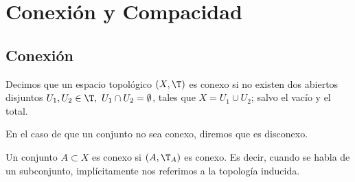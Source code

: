 \chapter{Conexión y Compacidad}

\section{Conexión}

\begin{definicion}[Conexión]
    Decimos que un espacio topológico $(X,\T)$ es conexo si no existen dos abiertos disjuntos $U_1,U_2\in \T,~U_1\cap U_2=\emptyset$, tales que $X=U_1\cup U_2$; salvo el vacío y el total.

    En el caso de que un conjunto no sea conexo, diremos que es disconexo.

    Un conjunto $A\subset X$ es conexo si $(A,\T_A)$ es conexo. Es decir, cuando se habla de un subconjunto, implícitamente nos referimos a la topología inducida.
\end{definicion}

